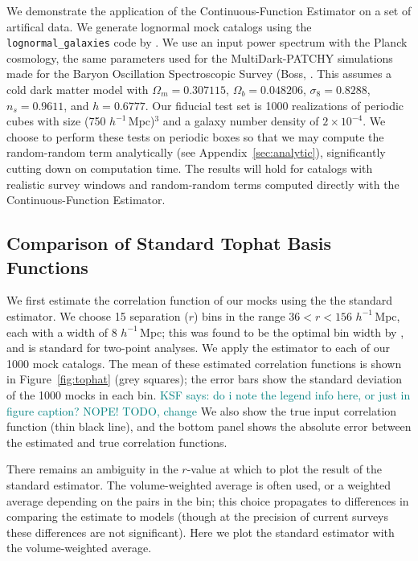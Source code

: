 \documentclass[modern]{aastex62}
\newcommand{\est}{the Continuous-Function Estimator\xspace}
\newcommand{\hmpc}{$h^{-1}\,$Mpc}
\newcommand{\KSF}[1]{\textcolor{teal}{KSF says: #1}}
\begin{document}
We demonstrate the application of \est on a set of artifical data.
We generate lognormal mock catalogs \citep{ColesJones1991} using the \texttt{lognormal\_galaxies} code by \citep{Agrawal2017}.
We use an input power spectrum with the Planck cosmology, the same parameters used for the MultiDark-PATCHY simulations \citep{Kitaura2016} made for the Baryon Oscillation Spectroscopic Survey (Boss, \citealt{Dawson2013}.
This assumes a cold dark matter model with $\Omega_m = 0.307115$, $\Omega_b = 0.048206$, $\sigma_8 = 0.8288$, $n_s = 0.9611$, and $h = 0.6777$.
Our fiducial test set is 1000 realizations of periodic cubes with size (750 \hmpc)$^3$ and a galaxy number density of $2 \times 10^{-4}$.
We choose to perform these tests on periodic boxes so that we may compute the random-random term analytically (see Appendix~\ref{sec:analytic}), significantly cutting down on computation time.
The results will hold for catalogs with realistic survey windows and random-random terms computed directly with \est.

\subsection{Comparison of Standard Tophat Basis Functions}

We first estimate the correlation function of our mocks using the the standard estimator.
We choose 15 separation ($r$) bins in the range $36 < r < 156$ \hmpc, each with a width of 8 \hmpc; this was found to be the optimal bin width by \cite{Percival2014}, and is standard for two-point analyses.
We apply the estimator to each of our 1000 mock catalogs.
The mean of these estimated correlation functions is shown in Figure~\ref{fig:tophat} (grey squares); the error bars show the standard deviation of the 1000 mocks in each bin.
\KSF{do i note the legend info here, or just in figure caption? NOPE! TODO, change}
We also show the true input correlation function (thin black line), and the bottom panel shows the absolute error between the estimated and true correlation functions.

There remains an ambiguity in the $r$-value at which to plot the result of the standard estimator. 
The volume-weighted average is often used, or a weighted average depending on the pairs in the bin; this choice propagates to differences in comparing the estimate to models (though at the precision of current surveys these differences are not significant).
Here we plot the standard estimator with the volume-weighted average.
\end{document}
